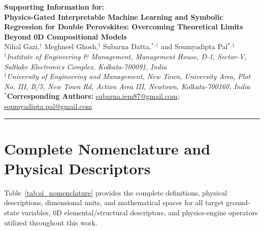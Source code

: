 \documentclass[11pt,a4paper]{article}
\begin{document}
\begin{center}
    {\Large \textbf{Supporting Information for:}}\\[1.2em]
    {\LARGE \textbf{Physics-Gated Interpretable Machine Learning and Symbolic Regression for Double Perovskites: Overcoming Theoretical Limits Beyond 0D Compositional Models}}\\[1.5em]

    {\large Nihal Gazi,$^{\dagger}$ Meghneel Ghosh,$^{\dagger}$ Subarna Datta,$^{*,\dagger}$ and Soumyadipta Pal$^{*,\ddagger}$}\\[1em]

    $^{\dagger}$\textit{Institute of Engineering \& Management, Management House, D-1, Sector-V, Saltlake Electronics Complex, Kolkata-700091, India}\\[0.4em]
    $^{\ddagger}$\textit{University of Engineering and Management, New Town, University Area, Plot No. III, B/5, New Town Rd, Action Area III, Newtown, Kolkata-700160, India}\\[0.8em]

    $^{*}$\textbf{Corresponding Authors:} \href{mailto:subarna.iem87@gmail.com}{subarna.iem87@gmail.com}; \href{mailto:soumyadipta.pal@gmail.com}{soumyadipta.pal@gmail.com}
\end{center}

\vspace{1.5em}
\hrule
\vspace{1.5em}

\tableofcontents
\newpage

\section{Complete Nomenclature and Physical Descriptors}
\label{sec:si_nomenclature}

Table~\ref{tab:si_nomenclature} provides the complete definitions, physical descriptions, dimensional units, and mathematical spaces for all target ground-state variables, 0D elemental/structural descriptors, and physics-engine operators utilized throughout this work.
\end{document}
